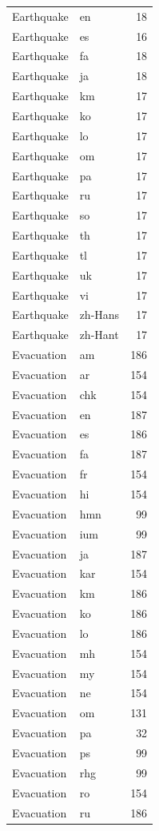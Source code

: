 \begin{longtable}{p{3cm} p{3cm} r}
Earthquake & en & 18 \\
Earthquake & es & 16 \\
Earthquake & fa & 18 \\
Earthquake & ja & 18 \\
Earthquake & km & 17 \\
Earthquake & ko & 17 \\
Earthquake & lo & 17 \\
Earthquake & om & 17 \\
Earthquake & pa & 17 \\
Earthquake & ru & 17 \\
Earthquake & so & 17 \\
Earthquake & th & 17 \\
Earthquake & tl & 17 \\
Earthquake & uk & 17 \\
Earthquake & vi & 17 \\
Earthquake & zh-Hans & 17 \\
Earthquake & zh-Hant & 17 \\
Evacuation & am & 186 \\
Evacuation & ar & 154 \\
Evacuation & chk & 154 \\
Evacuation & en & 187 \\
Evacuation & es & 186 \\
Evacuation & fa & 187 \\
Evacuation & fr & 154 \\
Evacuation & hi & 154 \\
Evacuation & hmn & 99 \\
Evacuation & ium & 99 \\
Evacuation & ja & 187 \\
Evacuation & kar & 154 \\
Evacuation & km & 186 \\
Evacuation & ko & 186 \\
Evacuation & lo & 186 \\
Evacuation & mh & 154 \\
Evacuation & my & 154 \\
Evacuation & ne & 154 \\
Evacuation & om & 131 \\
Evacuation & pa & 32 \\
Evacuation & ps & 99 \\
Evacuation & rhg & 99 \\
Evacuation & ro & 154 \\
Evacuation & ru & 186 \\

\end{longtable}
